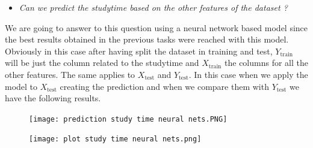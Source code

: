\documentclass[a4paper, 11pt]{report}
\theoremstyle{definition}
\numberwithin{equation}{section}		%
\numberwithin{figure}{section}			%
\numberwithin{table}{section}				%
\begin{document}
\begin{itemize}
    \item \textit{Can we predict the studytime based on the other features of the dataset ?}
\end{itemize}
We are going to answer to this question using a neural network based model since the best results obtained in the previous tasks were reached with this model. Obviously in this case after having split the dataset in training and test, $Y_{\text{train}}$ will be just the column related to the studytime and $X_{\text{train}}$ the columns for all the other features. The same applies to $X_{\text{test}}$ and $Y_{\text{test}}$. In this case when we apply the model to $X_{\text{test}}$ creating the prediction and when we compare them with $Y_{\text{test}}$ we have the following results.

\begin{figure}[h]\centering
\texttt{[image: prediction study time neural nets.PNG]}
\end{figure}
    \begin{figure}[h]\centering
\texttt{[image: plot study time neural nets.png]}
\end{figure}
\end{document}
